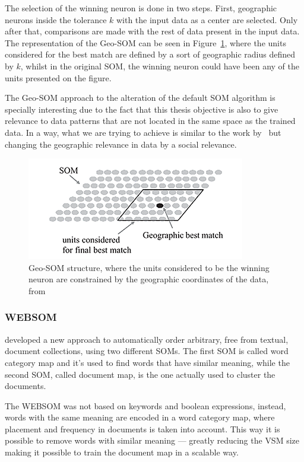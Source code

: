 \documentclass[journal]{IEEEtran}
\begin{document}
The selection of the winning neuron is done in two steps. First, geographic neurons inside the tolerance $k$ with the input data as a center are selected. Only after that, comparisons are made with the rest of data present in the input data. The representation of the Geo-SOM can be seen in Figure~\ref{fig:geo_som}, where the units considered for the best match are defined by a sort of geographic radius defined by $k$, whilst in the original \ac{SOM}, the winning neuron could have been any of the units presented on the figure.

The Geo-SOM approach to the alteration of the default \ac{SOM} algorithm is specially interesting due to the fact that this thesis objective is also to give relevance to data patterns that are not located in the same space as the trained data. In a way, what we are trying to achieve is similar to the work by~\citet{Bacao2005} but changing the geographic relevance in data by a social relevance.
\begin{figure}[tb]
  \begin{center}
    \includegraphics[width=0.8\linewidth]{images/6_geo-som.png}
  \end{center}
  \caption{Geo-SOM structure, where the units considered to be the winning neuron are constrained by the geographic coordinates of the data, from~\citet{Bacao2005}}
  \label{fig:geo_som}
\end{figure}

\subsubsection{WEBSOM}
\label{sub:websom}
\citet{honkelawebsom} developed a new approach to automatically order arbitrary, free from textual, document collections, using two different SOMs. The first \ac{SOM} is called word category map and it's used to find words that have similar meaning, while the second \ac{SOM}, called document map, is the one actually used to cluster the documents. 

The WEBSOM was not based on keywords and boolean expressions, instead, words with the same meaning are encoded in a word category map, where placement and frequency in documents is taken into account. This way it is possible to remove words with similar meaning --- greatly reducing the \ac{VSM} size  making it possible to train the document map in a scalable way.
                                                                                                          
\end{document}
